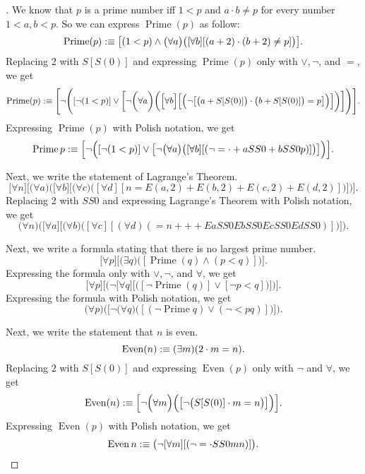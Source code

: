 \begin{proof}[]
  We know that \(p\) is a prime number iff \(1 < p\) and \(a \cdot b \neq p\) for every number \(1 < a, b < p\).
  So we can express \(\operatorname{Prime}(p)\) as follow:
  \[
    \operatorname{Prime}(p) :\equiv \big[(1 < p) \land \big(\forall a\big)\big([\forall b][(a + 2) \cdot (b + 2) \neq p]\big)\big].
  \]
  Replacing \(2\) with \(S[S(0)]\) and expressing \(\operatorname{Prime}(p)\) only with \(\lor, \lnot\), and \(=\), we get
  \[
    \operatorname{Prime}(p) :\equiv \Bigg[\lnot\Bigg([\lnot(1 < p)] \lor \bigg[\lnot\bigg(\forall a\bigg)\bigg(\Big[\forall b\Big]\Big[\Big(\lnot \big[\big(a + S[S(0)]\big) \cdot \big(b + S[S(0)]\big) = p\big]\Big)\Big]\bigg)\bigg]\Bigg)\Bigg].
  \]
  Expressing \(\operatorname{Prime}(p)\) with Polish notation, we get
  \[
    \operatorname{Prime} p :\equiv \Big[\lnot\Big([\lnot(1 < p)] \lor \big[\lnot\big(\forall a\big)\big([\forall b][(\lnot = \cdot + a S S 0 + b S S 0 p)]\big)\big]\Big)\Big].
  \]

  Next, we write the statement of Lagrange's Theorem.
  \[
    \Big[\forall n\Big]\Big[\Big(\forall a\Big)\Big(\big[\forall b\big]\big[\big(\forall c\big)\big([\forall d][n = E(a, 2) + E(b, 2) + E(c, 2) + E(d, 2)]\big)\big]\Big)\Big].
  \]
  Replacing \(2\) with \(S S 0\) and expressing Lagrange's Theorem with Polish notation, we get
  \[
    \Big(\forall n\Big)\Big(\big[\forall a\big]\big[\big(\forall b\big)\big([\forall c][(\forall d)(= n + + + E a S S 0 E b S S 0 E c S S 0 E d S S 0)]\big)\big]\Big).
  \]

  Next, we write a formula stating that there is no largest prime number.
  \[
    \big[\forall p\big]\big[\big(\exists q\big)\big([\operatorname{Prime}(q) \land (p < q)]\big)\big].
  \]
  Expressing the formula only with \(\lor, \lnot\), and \(\forall\), we get
  \[
    \Big[\forall p\Big]\Big[\Big(\lnot \big[\forall q\big]\big[\big([\lnot \operatorname{Prime}(q)] \lor [\lnot p < q]\big)\big]\Big)\Big].
  \]
  Expressing the formula with Polish notation, we get
  \[
    \Big(\forall p\Big)\Big(\big[\lnot \big(\forall q\big)\big([(\lnot \operatorname{Prime} q) \lor (\lnot < p q)]\big)\big]\Big).
  \]

  Next, we write the statement that \(n\) is even.
  \[
    \operatorname{Even}(n) :\equiv (\exists m)(2 \cdot m = n).
  \]
  Replacing \(2\) with \(S[S(0)]\) and expressing \(\operatorname{Even}(p)\) only with \(\lnot\) and \(\forall\), we get
  \[
    \operatorname{Even}(n) :\equiv \Big[\lnot \Big(\forall m\Big)\Big(\big[\lnot \big(S[S(0)] \cdot m = n\big)\big]\Big)\Big].
  \]
  Expressing \(\operatorname{Even}(p)\) with Polish notation, we get
  \[
    \operatorname{Even} n :\equiv \big(\lnot [\forall m][(\lnot = \cdot S S 0 m n)]\big).
  \]


\end{proof}
